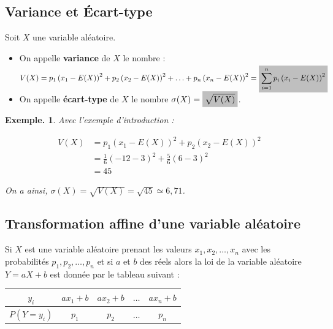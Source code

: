\documentclass[12pt]{article}
\theoremstyle{break}
\newtheorem*{example}{Exemple.}
\begin{document}
\subsection{Variance et Écart-type}
\begin{definition}{}{}
  Soit $X$ une variable aléatoire.

  \begin{itemize}
    \item On appelle \textbf{variance} de $X$ le nombre :

  $$
  V(X)=p_{1}\left(x_{1}-E(X)\right)^{2}+p_{2}\left(x_{2}-E(X)\right)^{2}+\ldots+p_{n}\left(x_{n}-E(X)\right)^{2}=\hideM{\sum_{i=1}^{n} p_{i}\left(x_{i}-E(X)\right)^{2}}
  $$

    \item On appelle \textbf{écart-type} de $X$ le nombre $\sigma(X)=\hideM{\sqrt{V(X)}}$.
  \end{itemize}
\end{definition}

\newpage

\begin{example}
  Avec l'exemple d'introduction :

  $$
  \begin{aligned}
    V(X) & =p_{1}\left(x_{1}-E(X)\right)^{2}+p_{2}\left(x_{2}-E(X)\right)^{2} \\
    & =\frac{1}{6}(-12-3)^{2}+\frac{5}{6}(6-3)^{2} \\
    & =45
  \end{aligned}
  $$

  On a ainsi, $\sigma(X)=\sqrt{V(X)}=\sqrt{45} \simeq 6,71$.
\end{example}

\subsection{Transformation affine d'une variable aléatoire}
\begin{proposition}{}{}
  Si $X$ est une variable aléatoire prenant les valeurs $x_{1}, x_{2}, \ldots, x_{n}$ avec les probabilités $p_{1}, p_{2}, \ldots, p_{n}$ et si $a$ et $b$ des réels alors la loi de la variable aléatoire $Y=a X+b$ est donnée par le tableau suivant :

  \begin{center}
    \begin{tabular}{|c|c|c|c|c|}
      \hline
      $y_{i}$ & $a x_{1}+b$ & $a x_{2}+b$ & $\ldots$ & $a x_{n}+b$ \\
      \hline
      $P\left(Y=y_{i}\right)$ & $p_{1}$ & $p_{2}$ & $\ldots$ & $p_{n}$ \\
      \hline
    \end{tabular}
  \end{center}
\end{proposition}
\end{document}
